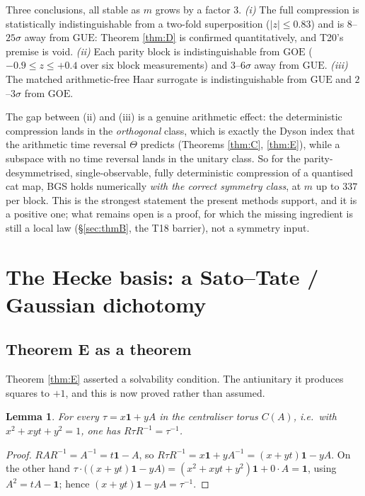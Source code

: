 \documentclass[11pt,reqno]{amsart}
\newtheorem{lemma}[theorem]{Lemma}
\theoremstyle{definition}
\newcommand{\GUE}{\mathrm{GUE}}
\newcommand{\GOE}{\mathrm{GOE}}
\begin{document}
Three conclusions, all stable as $m$ grows by a factor $3$.
\emph{(i)} The full compression is statistically indistinguishable from a
two-fold superposition ($|z|\le0.83$) and is $8$--$25\sigma$ away from $\GUE$:
Theorem \ref{thm:D} is confirmed quantitatively, and T20's premise is void.
\emph{(ii)} Each parity block is indistinguishable from $\GOE$
($-0.9\le z\le+0.4$ over six block measurements) and $3$--$6\sigma$ away from
$\GUE$. \emph{(iii)} The matched arithmetic-free Haar surrogate is
indistinguishable from $\GUE$ and $2$--$3\sigma$ from $\GOE$.

The gap between (ii) and (iii) is a genuine arithmetic effect: the deterministic
compression lands in the \emph{orthogonal} class, which is exactly the Dyson
index that the arithmetic time reversal $\Theta$ predicts (Theorems \ref{thm:C},
\ref{thm:E}), while a subspace with no time reversal lands in the unitary class.
So for the parity-desymmetrised, single-observable, fully deterministic
compression of a quantised cat map, BGS holds numerically \emph{with the
correct symmetry class}, at $m$ up to $337$ per block. This is the strongest
statement the present methods support, and it is a positive one; what remains
open is a proof, for which the missing ingredient is still a local law
(\S\ref{sec:thmB}, the T18 barrier), not a symmetry input.

\section{The Hecke basis: a Sato--Tate / Gaussian dichotomy}\label{sec:hecke}

\subsection{Theorem E as a theorem}

Theorem \ref{thm:E} asserted a solvability condition. The antiunitary it produces
squares to $+1$, and this is now proved rather than assumed.

\begin{lemma}\label{lem:torusinv}
For every $\tau=x\mathbf1+yA$ in the centraliser torus $C(A)$, i.e.\ with
$x^2+xyt+y^2=1$, one has $R\tau R^{-1}=\tau^{-1}$.
\end{lemma}
\begin{proof}
$RAR^{-1}=A^{-1}=t\mathbf1-A$, so $R\tau R^{-1}=x\mathbf1+yA^{-1}
=(x+yt)\mathbf1-yA$. On the other hand $\tau\cdot\bigl((x+yt)\mathbf1-yA\bigr)
=(x^2+xyt+y^2)\mathbf1+0\cdot A=\mathbf1$, using $A^2=tA-\mathbf1$; hence
$(x+yt)\mathbf1-yA=\tau^{-1}$.
\end{proof}
\end{document}
